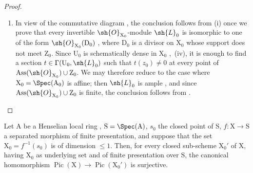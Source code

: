 \begin{proof}
\begin{enumerate}[label=(\roman*)]
The choice of $\mathrm{U}^{(x)}$ therefore defines a divisor $\mathrm{D}'^{(x)}=\operatorname{div}(g^{(x)})$ on $\mathrm{U}^{(x)}$.
We have also seen that $x$ is necessarily isolated in $\mathrm{V}^{(x)}\cap\mathrm{X}_0$; shrinking once more, we may suppose $\mathrm{V}^{(x)}\cap\mathrm{X}_0=\{x\}$.
By condition $2^{\mathrm{o}}$, there is then a subset $\mathrm{W}^{(x)}$ of $\mathrm{V}^{(x)}$, closed in $\mathrm{X}$ and open in $\mathrm{V}^{(x)}$, such that $\mathrm{W}^{(x)}\cap\mathrm{X}_0=\{x\}$.
Replacing $\mathrm{U}^{(x)}$ once more by a smaller open neighbourhood of $x$, we may suppose $\mathrm{W}^{(x)}=\mathrm{V}^{(x)}$, or in other words that $\mathrm{V}^{(x)}$ is closed in $\mathrm{X}$.
We may now define a divisor $\mathrm{D}^{(x)}$ on $\mathrm{X}$ by requiring $\mathrm{D}^{(x)}|\mathrm{U}^{(x)}=\mathrm{D}'^{(x)}$ and $\mathrm{D}^{(x)}|(\mathrm{X}-\mathrm{V}^{(x)})=0$; this is well defined because on $\mathrm{U}^{(x)}\cap(\mathrm{X}-\mathrm{V}^{(x)})$ the section $g^{(x)}$ is invertible.
It is then enough to take $\mathrm{D}=\sum_{x\in\mathrm{T}}\mathrm{D}^{(x)}$, a meaningful sum since $\mathrm{T}$ is finite.


  \item In view of the commutative diagram , the conclusion follows from (i) once we prove that every invertible $\sh{O}_{\mathrm{X}_0}$-module $\sh{L}_0$ is isomorphic to one of the form $\sh{O}_{\mathrm{X}_0}(\mathrm{D}_0)$ , where $\mathrm{D}_0$ is a divisor on $\mathrm{X}_0$ whose support does not meet $\mathrm{Z}_0$.
Since $\mathrm{U}_0$ is schematically dense in $\mathrm{X}_0$ ,{}~(iv), it is enough  to find a section $t\in\Gamma(\mathrm{U}_0,\sh{L}_0)$ such that $t(z_0)\neq0$ at every point of $\operatorname{Ass}(\sh{O}_{\mathrm{X}_0})\cup\mathrm{Z}_0$.
We may therefore reduce to the case where $\mathrm{X}_0=\Spec(\mathrm{A}_0)$ is affine; then $\sh{L}_0$ is ample , and since $\operatorname{Ass}(\sh{O}_{\mathrm{X}_0})\cup\mathrm{Z}_0$ is finite, the conclusion follows from .
\end{enumerate}
\end{proof}

\begin{corollary}[21.9.12]
\label{IV.21.9.12}
Let $\mathrm{A}$ be a Henselian local ring , $\mathrm{S}=\Spec(\mathrm{A})$, $s_0$ the closed point of $\mathrm{S}$, $f:\mathrm{X}\to\mathrm{S}$ a separated morphism of finite presentation, and suppose that the set $\mathrm{X}_0=f^{-1}(s_0)$ is of dimension $\leq 1$.
Then, for every closed sub-scheme $\mathrm{X}_0'$ of $\mathrm{X}$, having $\mathrm{X}_0$ as underlying set and of finite presentation over $\mathrm{S}$, the canonical homomorphism  $\operatorname{Pic}(\mathrm{X})\to\operatorname{Pic}(\mathrm{X}_0')$ is surjective.
\end{corollary}

